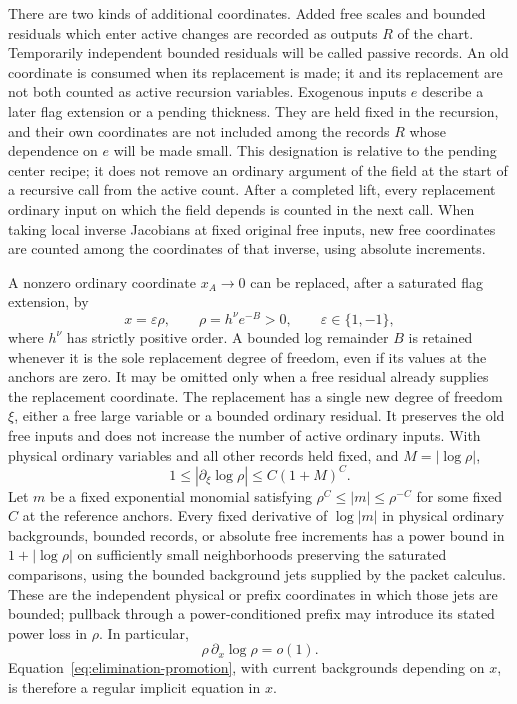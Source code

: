 There are two kinds of additional coordinates.  Added free scales and
bounded residuals which enter active changes are recorded as outputs
$R$ of the chart.  Temporarily independent bounded residuals will be
called passive records.  An old coordinate is consumed when its
replacement is made; it and its replacement are not both counted as
active recursion variables.  Exogenous inputs $e$ describe a later flag
extension or a pending thickness.  They are held fixed in the recursion,
and their own coordinates are not included among the records $R$ whose
dependence on $e$ will be made small.  This designation is relative
to the pending center recipe; it does not remove an ordinary argument
of the field at the start of a recursive call from the active count.
After a completed lift, every replacement ordinary input on which the
field depends is counted in the next call.  When taking local inverse
Jacobians at fixed original free inputs, new free coordinates are counted
among the coordinates of that inverse, using absolute increments.

\begin{lemma}
\label{lem:elimination-promotion}
A nonzero ordinary coordinate $x_A\to0$ can be replaced, after a
saturated flag extension, by
\begin{equation}\label{eq:elimination-promotion}
 x=\varepsilon\rho,\qquad
 \rho=h^\nu e^{-B}>0,\qquad \varepsilon\in\{1,-1\},
\end{equation}
where $h^\nu$ has strictly positive order.  A bounded log remainder
$B$ is retained whenever it is the sole replacement degree of freedom,
even if its values at the anchors are zero.  It may be omitted only
when a free residual already supplies the replacement coordinate.
The replacement has a single new degree
of freedom $\xi$, either a free large variable or a bounded ordinary
residual.  It preserves the old free inputs and does not increase the
number of active ordinary inputs.  With physical ordinary variables and
all other records held fixed, and $M=|\log\rho|$,
\begin{equation}\label{eq:elimination-direct}
 1\le |\partial_\xi\log\rho|\le C(1+M)^C.
\end{equation}
Let $m$ be a fixed exponential monomial satisfying
$\rho^C\le |m|\le\rho^{-C}$ for some fixed $C$ at the reference
anchors.  Every fixed derivative of $\log|m|$ in physical ordinary
backgrounds, bounded records, or absolute free increments has a power
bound in $1+|\log\rho|$ on sufficiently small neighborhoods preserving
the saturated comparisons, using the bounded background jets supplied
by the packet calculus.  These are the independent physical or prefix
coordinates in which those jets are bounded; pullback through a
power-conditioned prefix may introduce its stated power loss in
$\rho$.  In particular,
\begin{equation}\label{eq:elimination-feedback}
 \rho\,\partial_x\log\rho=o(1).
\end{equation}
Equation~\eqref{eq:elimination-promotion}, with current backgrounds
depending on $x$, is therefore a regular implicit equation in $x$.
\end{lemma}

